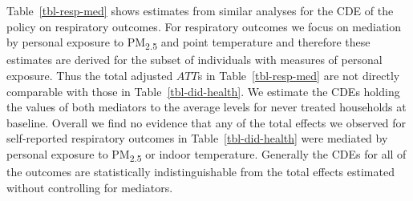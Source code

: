 \documentclass[
  letterpaper,
  DIV=11,
  numbers=noendperiod]{scrartcl}
\begin{document}
Table~\ref{tbl-resp-med} shows estimates from similar analyses for the
CDE of the policy on respiratory outcomes. For respiratory outcomes we
focus on mediation by personal exposure to PM\textsubscript{2.5} and
point temperature and therefore these estimates are derived for the
subset of individuals with measures of personal exposure. Thus the total
adjusted \(ATT\)s in Table~\ref{tbl-resp-med} are not directly
comparable with those in Table~\ref{tbl-did-health}. We estimate the
CDEs holding the values of both mediators to the average levels for
never treated households at baseline. Overall we find no evidence that
any of the total effects we observed for self-reported respiratory
outcomes in Table~\ref{tbl-did-health} were mediated by personal
exposure to PM\textsubscript{2.5} or indoor temperature. Generally the
CDEs for all of the outcomes are statistically indistinguishable from
the total effects estimated without controlling for mediators.
\end{document}

